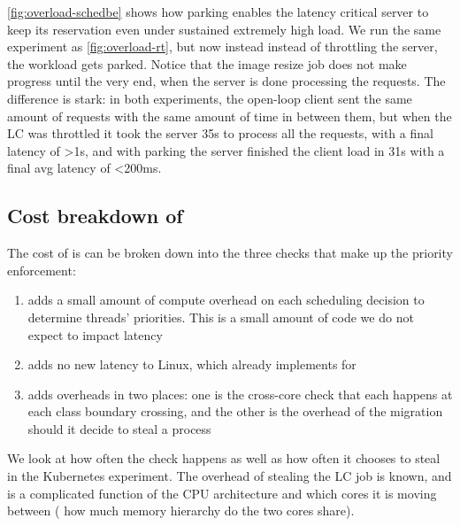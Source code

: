 \autoref{fig:overload-schedbe} shows how parking enables the latency critical
server to keep its reservation even under sustained extremely high load. We run
the same experiment as \autoref{fig:overload-rt}, but now instead instead of
throttling the server, the \schedbe{} workload gets parked. Notice that the
\schedbe{} image resize job does not make progress until the very end, when the
server is done processing the requests. The difference is stark: in both
experiments, the open-loop client sent the same amount of requests with the same
amount of time in between them, but when the LC was throttled it took the server
35s to process all the requests, with a final latency of >1s, and with parking
the server finished the client load in 31s with a final avg latency of <200ms. 



\subsection{Cost breakdown of \schedbe{}}

The cost of \schedbe{} is can be broken down into the three checks that make up
the priority enforcement:

\begin{enumerate}
    \item \local{} adds a small amount of compute overhead on each scheduling
    decision to determine threads' priorities. This is a small amount of code we
    do not expect to impact latency
    \item \entry{} adds no new latency to Linux, which already implements
    \entry{} for \schedidle{}
    \item \exit{} adds overheads in two places: one is the cross-core check that
    each happens at each class boundary crossing, and the other is the overhead
    of the migration should it decide to steal a \schednormal{} process
\end{enumerate}

We look at how often the \exit{} check happens as well as how often it chooses
to steal in the Kubernetes experiment. The overhead of stealing the LC job is
known, and is a complicated function of the CPU architecture and which cores it
is moving between (\eg{} how much memory hierarchy do the two cores share).

